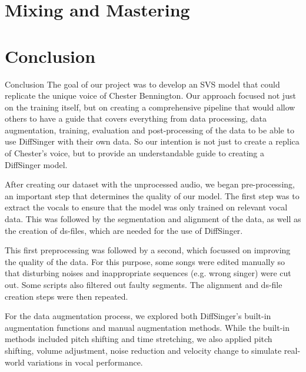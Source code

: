 \documentclass[a4paper]{article}
\begin{document}
\section{Mixing and Mastering}



\section{Conclusion}

Conclusion
The goal of our project was to develop an SVS model that could replicate the unique voice of Chester Bennington. Our approach focused not just on the training itself, but on creating a comprehensive pipeline that would allow others to have a guide that covers everything from data processing, data augmentation, training, evaluation and post-processing of the data to be able to use DiffSinger with their own data. So our intention is not just to create a replica of Chester's voice, but to provide an understandable guide to creating a DiffSinger model.

After creating our dataset with the unprocessed audio, we began pre-processing, an important step that determines the quality of our model. The first step was to extract the vocals to ensure that the model was only trained on relevant vocal data. This was followed by the segmentation and alignment of the data, as well as the creation of ds-files, which are needed for the use of DiffSinger.

This first preprocessing was followed by a second, which focussed on improving the quality of the data. For this purpose, some songs were edited manually so that disturbing noises and inappropriate sequences (e.g. wrong singer) were cut out. Some scripts also filtered out faulty segments. The alignment and ds-file creation steps were then repeated.

For the data augmentation process, we explored both DiffSinger's built-in augmentation functions and manual augmentation methods. While the built-in methods included pitch shifting and time stretching, we also applied pitch shifting, volume adjustment, noise reduction and velocity change to simulate real-world variations in vocal performance.
\end{document}
